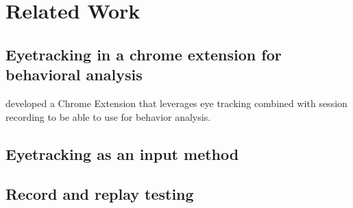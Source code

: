 \section{Related Work}




\subsection{Eyetracking in a chrome extension for behavioral analysis}

\cite{art:behavioral-analysis-2024} developed a Chrome Extension that leverages eye tracking combined with session recording to be able to use for behavior analysis.

\subsection{Eyetracking as an input method}

\subsection{Record and replay testing}

